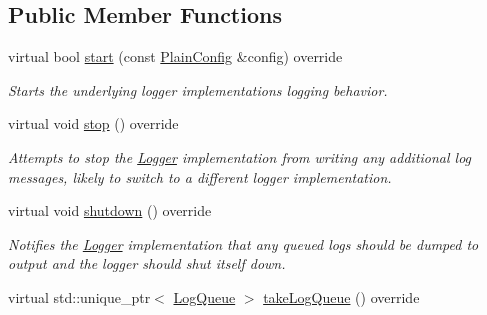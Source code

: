 \subsection*{Public Member Functions}
\begin{DoxyCompactItemize}
\item 
virtual bool \hyperlink{class_aws_1_1_iot_1_1_device_client_1_1_logging_1_1_file_logger_ac9373269d6d5c7a5ee1ba896182c97ff}{start} (const \hyperlink{struct_aws_1_1_iot_1_1_device_client_1_1_plain_config}{Plain\+Config} \&config) override
\begin{DoxyCompactList}\small\item\em Starts the underlying logger implementation\textquotesingle{}s logging behavior. \end{DoxyCompactList}\item 
\mbox{\label{class_aws_1_1_iot_1_1_device_client_1_1_logging_1_1_file_logger_a31cbe6ad19051138966eae72ff233702}} 
virtual void \hyperlink{class_aws_1_1_iot_1_1_device_client_1_1_logging_1_1_file_logger_a31cbe6ad19051138966eae72ff233702}{stop} () override
\begin{DoxyCompactList}\small\item\em Attempts to stop the \hyperlink{class_aws_1_1_iot_1_1_device_client_1_1_logging_1_1_logger}{Logger} implementation from writing any additional log messages, likely to switch to a different logger implementation. \end{DoxyCompactList}\item 
\mbox{\label{class_aws_1_1_iot_1_1_device_client_1_1_logging_1_1_file_logger_a7cbd7f8942bc9da32a9ff385128d5519}} 
virtual void \hyperlink{class_aws_1_1_iot_1_1_device_client_1_1_logging_1_1_file_logger_a7cbd7f8942bc9da32a9ff385128d5519}{shutdown} () override
\begin{DoxyCompactList}\small\item\em Notifies the \hyperlink{class_aws_1_1_iot_1_1_device_client_1_1_logging_1_1_logger}{Logger} implementation that any queued logs should be dumped to output and the logger should shut itself down. \end{DoxyCompactList}\item 
virtual std\+::unique\+\_\+ptr$<$ \hyperlink{class_aws_1_1_iot_1_1_device_client_1_1_logging_1_1_log_queue}{Log\+Queue} $>$ \hyperlink{class_aws_1_1_iot_1_1_device_client_1_1_logging_1_1_file_logger_a5c55467d8f46332d6ef2acde379df2f7}{take\+Log\+Queue} () override

\end{DoxyCompactItemize}
